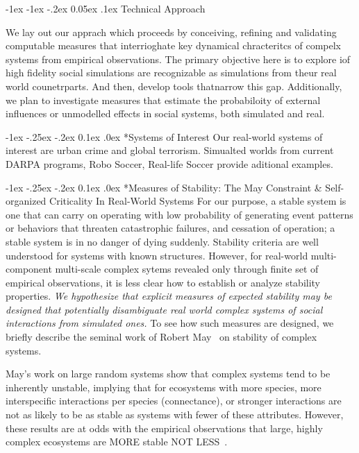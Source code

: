 \documentclass[onecolumn, compsoc,11pt]{IEEEtran}
\makeatletter
\renewcommand\section{\@startsection {section}{1}{\z@}%
  {-1ex \@plus -1ex \@minus -.2ex}%
  {0.05ex \@plus.1ex}%
  {\large\bfseries\scshape}}
\renewcommand\subsection{\@startsection {section}{1}{\z@}%
  {-1ex \@plus -.25ex \@minus -.2ex}%
  {0.1ex \@plus.0ex}%
  {\fontsize{11}{10}\selectfont\bfseries\sffamily\color{DodgerBlue4}}}
\makeatother
\begin{document}
\section{Technical Approach}


We lay out our apprach which proceeds by conceiving, refining and validating computable measures that interrioghate key dynamical chracteritcs of compelx systems from empirical observations. The primary objective here is to explore iof high fidelity social simulations are recognizable as simulations from theur real world counetrparts. And then, develop tools thatnarrow this gap. Additionally, we plan to investigate measures that estimate the probabiloity of external influences or unmodelled effects in social systems, both simulated and real.

\subsection*{Systems of Interest} Our real-world systems of interest are urban crime and global terrorism. Simualted worlds from current DARPA programs, Robo Soccer, Real-life Soccer provide aditional examples.

\subsection*{Measures of Stability: The May Constraint \& Self-organized Criticality In Real-World Systems}
 For our purpose, a stable system  is one that can carry on operating with low probability of generating event patterns or behaviors that threaten catastrophic failures, and cessation of operation; a stable system  is in no danger of dying suddenly. Stability criteria are well understood for systems with known structures. However, for real-world multi-component multi-scale complex  sytems revealed only  through finite set of empirical observations, it is less clear how to establish or analyze stability properties.  \textit{We hypothesize that explicit  measures of expected stability may be designed that potentially disambiguate real world complex systems of social interactions from simulated ones.} To see how such measures are  designed, we  briefly describe the seminal work of Robert May~\cite{may1972will,may2001stability} on  stability of complex systems.

May's work on  large random systems  show  that  complex systems tend to be inherently unstable, implying that for  ecosystems with more species, more interspecific interactions per species (connectance), or stronger interactions are not as likely to  be as stable as systems with fewer of these attributes. However, these results are at odds with the empirical  observations  that large, highly complex ecosystems are  MORE stable NOT LESS~\cite{jacquet2016no}.
\end{document}
